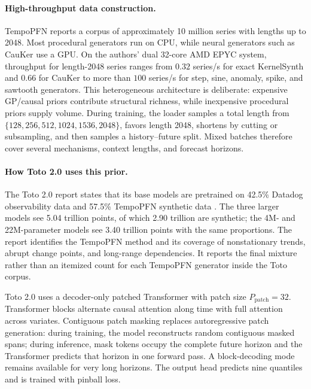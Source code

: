\paragraph{High-throughput data construction.}
TempoPFN reports a corpus of approximately 10 million series with lengths up to
2048. Most procedural generators run on CPU, while neural generators such as
CauKer use a GPU. On the authors' dual 32-core AMD EPYC system, throughput for
length-2048 series ranges from $0.32$ series/s for exact KernelSynth and $0.66$
for CauKer to more than $100$ series/s for step, sine, anomaly, spike, and
sawtooth generators. This heterogeneous architecture is deliberate: expensive
GP/causal priors contribute structural richness, while inexpensive procedural
priors supply volume. During training, the loader samples a total length from
$\{128,256,512,1024,1536,2048\}$, favors length 2048, shortens by cutting or
subsampling, and then samples a history--future split. Mixed batches therefore
cover several mechanisms, context lengths, and forecast horizons.

\paragraph{How Toto 2.0 uses this prior.}
The Toto 2.0 report states that its base models are pretrained on 42.5\%
Datadog observability data and 57.5\% TempoPFN synthetic data
\citep{khwaja2026toto2}. The three larger models see 5.04 trillion points, of
which 2.90 trillion are synthetic; the 4M- and 22M-parameter models see 3.40
trillion points with the same proportions. The report identifies the
TempoPFN method and its coverage of nonstationary trends, abrupt change points,
and long-range dependencies. It reports the final mixture rather than an
itemized count for each TempoPFN generator inside the Toto corpus.

Toto 2.0 uses a decoder-only patched Transformer with patch size
$P_{\mathrm{patch}}=32$. Transformer blocks alternate causal attention along
time with full attention across variates. Contiguous patch masking replaces
autoregressive patch generation: during training, the model reconstructs
random contiguous masked spans; during inference, mask tokens occupy the
complete future horizon and the Transformer predicts that horizon in one
forward pass. A block-decoding mode remains available for very long horizons.
The output head predicts nine quantiles and is trained with pinball loss.


